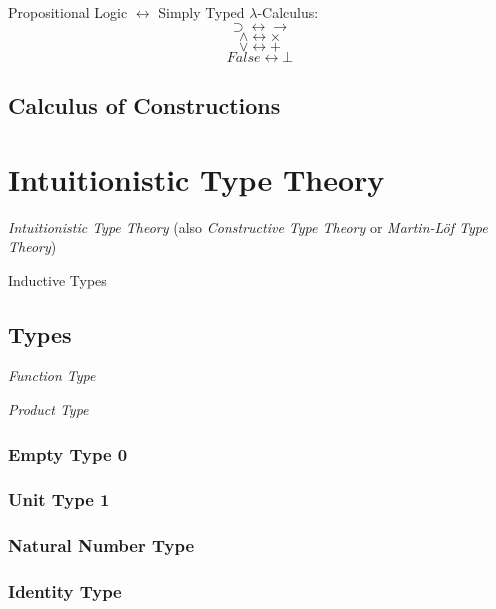 Propositional Logic $\leftrightarrow$ Simply Typed $\lambda$-Calculus:
\[
    \supset \leftrightarrow \rightarrow
\] \[
    \wedge \leftrightarrow \times
\] \[
    \vee \leftrightarrow +
\] \[
    False \leftrightarrow \bot
\]



\subsection{Calculus of Constructions}\label{subsec:coq}



\section{Intuitionistic Type Theory}

\emph{Intuitionistic Type Theory} (also \emph{Constructive Type
  Theory} or \emph{Martin-L\"of Type Theory})

Inductive Types



\subsection{Types}

\emph{Function Type}

\emph{Product Type}

\subsubsection{Empty Type $\mathbf{0}$}

\subsubsection{Unit Type $\mathbf{1}$}

\subsubsection{Natural Number Type}

\subsubsection{Identity Type}

